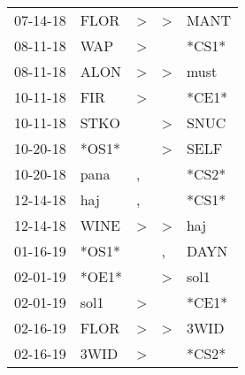 \begin{supertabular}{p{0.07\textwidth}p{0.06\textwidth}p{0.02\textwidth}p{0.02\textwidth}p{0.06\textwidth}}
          07-14-18\textsuperscript{} &           FLOR\textsuperscript{} &     \textgreater &     \textgreater &           MANT\textsuperscript{} \\
          08-11-18\textsuperscript{} &            WAP\textsuperscript{} &     \textgreater &                  &                            *CS1* \\
          08-11-18\textsuperscript{} &           ALON\textsuperscript{} &     \textgreater &     \textgreater &           must\textsuperscript{} \\
          10-11-18\textsuperscript{} &            FIR\textsuperscript{} &     \textgreater &                  &                            *CE1* \\
          10-11-18\textsuperscript{} &           STKO\textsuperscript{} &                  &     \textgreater &           SNUC\textsuperscript{} \\
          10-20-18\textsuperscript{} &                            *OS1* &                  &     \textgreater &           SELF\textsuperscript{} \\
          10-20-18\textsuperscript{} &           pana\textsuperscript{} &                , &                  &                            *CS2* \\
          12-14-18\textsuperscript{} &            haj\textsuperscript{} &                , &                  &                            *CS1* \\
          12-14-18\textsuperscript{} &           WINE\textsuperscript{} &     \textgreater &     \textgreater &            haj\textsuperscript{} \\
          01-16-19\textsuperscript{} &                            *OS1* &                  &                , &           DAYN\textsuperscript{} \\
          02-01-19\textsuperscript{} &                            *OE1* &                  &     \textgreater &           sol1\textsuperscript{} \\
          02-01-19\textsuperscript{} &           sol1\textsuperscript{} &     \textgreater &                  &                            *CE1* \\
          02-16-19\textsuperscript{} &           FLOR\textsuperscript{} &     \textgreater &     \textgreater &           3WID\textsuperscript{} \\
          02-16-19\textsuperscript{} &           3WID\textsuperscript{} &     \textgreater &                  &                            *CS2* \\

\end{supertabular}
